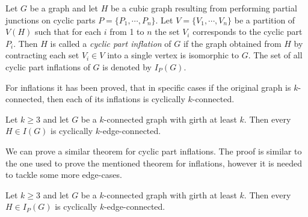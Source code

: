 \documentclass[12pt, twoside]{book}
\begin{document}
\begin{definition}
	\label{def:cyclic-part-inflation}
	Let $G$ be a graph and let $H$ be a cubic graph resulting from performing partial junctions on cyclic parts $P=\{P_1,\cdots,P_n\}$. Let $V=\{V_1,\cdots, V_n\}$ be a partition of $V(H)$ such that for each $i$ from 1 to $n$ the set $V_i$ corresponds to the cyclic part $P_i$. Then $H$ is called a \textit{cyclic part inflation} of $G$ if the graph obtained from $H$ by contracting each set $V_i\in V$ into a single vertex is isomorphic to $G$. The set of all cyclic part inflations of $G$ is denoted by $I_P(G)$.
\end{definition}

For inflations it has been proved, that in specific cases if the original graph is $k$-connected, then each of its inflations is cyclically $k$-connected.

\begin{theorem}
	Let $k \geq 3$ and let $G$ be a $k$-connected graph with girth at least $k$. Then every $H \in I(G)$ is cyclically $k$-edge-connected.
\end{theorem}

We can prove a similar theorem for cyclic part inflations. The proof is similar to the one used to prove the mentioned theorem for inflations, however it is needed to tackle some more edge-cases.

\begin{theorem}
	Let $k\geq 3$ and let $G$ be a $k$-connected graph with girth at least $k$. Then every  $H\in I_P(G)$ is cyclically $k$-edge-connected.
\end{theorem}
\end{document}
